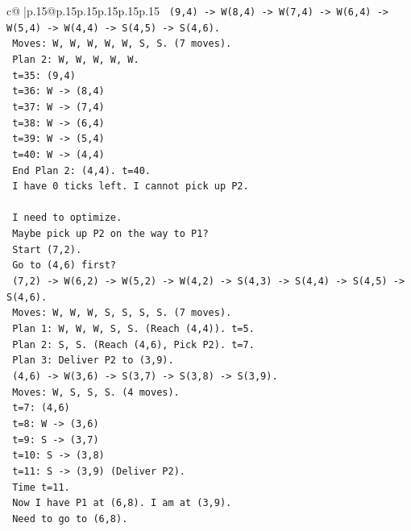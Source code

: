 \documentclass{article}
\begin{document}
{\begin{supertabular}{c@{$\;$}|p{.15\linewidth}@{}p{.15\linewidth}p{.15\linewidth}p{.15\linewidth}p{.15\linewidth}p{.15\linewidth}}
{{{\texttt{    (9,4) {-}> W(8,4) {-}> W(7,4) {-}> W(6,4) {-}> W(5,4) {-}> W(4,4) {-}> S(4,5) {-}> S(4,6).} \\
\texttt{    Moves: W, W, W, W, W, S, S. (7 moves).} \\
\texttt{    Plan 2: W, W, W, W, W.} \\
\texttt{    t=35: (9,4)} \\
\texttt{    t=36: W {-}> (8,4)} \\
\texttt{    t=37: W {-}> (7,4)} \\
\texttt{    t=38: W {-}> (6,4)} \\
\texttt{    t=39: W {-}> (5,4)} \\
\texttt{    t=40: W {-}> (4,4)} \\
\texttt{    End Plan 2: (4,4). t=40.} \\
\texttt{    I have 0 ticks left. I cannot pick up P2.} \\
\\ 
\texttt{    I need to optimize.} \\
\texttt{    Maybe pick up P2 on the way to P1?} \\
\texttt{    Start (7,2).} \\
\texttt{    Go to (4,6) first?} \\
\texttt{    (7,2) {-}> W(6,2) {-}> W(5,2) {-}> W(4,2) {-}> S(4,3) {-}> S(4,4) {-}> S(4,5) {-}> S(4,6).} \\
\texttt{    Moves: W, W, W, S, S, S, S. (7 moves).} \\
\texttt{    Plan 1: W, W, W, S, S. (Reach (4,4)). t=5.} \\
\texttt{    Plan 2: S, S. (Reach (4,6), Pick P2). t=7.} \\
\texttt{    Plan 3: Deliver P2 to (3,9).} \\
\texttt{    (4,6) {-}> W(3,6) {-}> S(3,7) {-}> S(3,8) {-}> S(3,9).} \\
\texttt{    Moves: W, S, S, S. (4 moves).} \\
\texttt{    t=7: (4,6)} \\
\texttt{    t=8: W {-}> (3,6)} \\
\texttt{    t=9: S {-}> (3,7)} \\
\texttt{    t=10: S {-}> (3,8)} \\
\texttt{    t=11: S {-}> (3,9) (Deliver P2).} \\
\texttt{    Time t=11.} \\
\texttt{    Now I have P1 at (6,8). I am at (3,9).} \\
\texttt{    Need to go to (6,8).} \\
}}}
\end{supertabular}}
\end{document}
